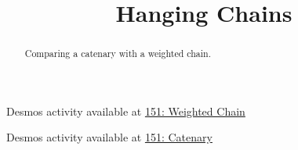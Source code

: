 \documentclass{ximera}
\title{Hanging Chains}
\begin{document}
\begin{abstract}
Comparing a catenary with a weighted chain.
\end{abstract}
\maketitle


\begin{question}  \label{Q:LMMN89}

\begin{onlineOnly}
    \begin{center}
\end{center}
\end{onlineOnly}

Desmos activity available at \href{https://www.desmos.com/calculator/cifsqaas5j}{151: Weighted Chain}


\end{question}


\begin{question}  \label{Q:DFDFGGtg}

\begin{onlineOnly}
    \begin{center}
\end{center}
\end{onlineOnly}

Desmos activity available at \href{https://www.desmos.com/calculator/sv70z21j2j}{151: Catenary}

\end{question}
\end{document}
